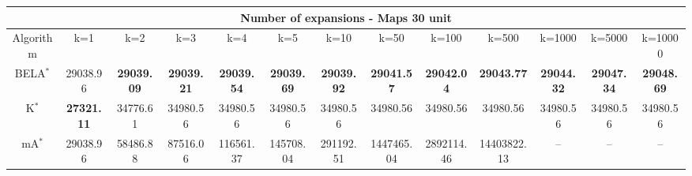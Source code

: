 \begin{tabular}{c|cccccccccccc}\toprule
\multicolumn{13}{c}{Number of expansions - Maps 30 unit}\\ \midrule
Algorithm & k=1 & k=2 & k=3 & k=4 & k=5 & k=10 & k=50 & k=100 & k=500 & k=1000 & k=5000 & k=10000 \\ \midrule
BELA$^*$ & 29038.96 & \textbf{29039.09} & \textbf{29039.21} & \textbf{29039.54} & \textbf{29039.69} & \textbf{29039.92} & \textbf{29041.57} & \textbf{29042.04} & \textbf{29043.77} & \textbf{29044.32} & \textbf{29047.34} & \textbf{29048.69} \\
K$^*$ & \textbf{27321.11} & 34776.61 & 34980.56 & 34980.56 & 34980.56 & 34980.56 & 34980.56 & 34980.56 & 34980.56 & 34980.56 & 34980.56 & 34980.56 \\
mA$^*$ & 29038.96 & 58486.88 & 87516.06 & 116561.37 & 145708.04 & 291192.51 & 1447465.04 & 2892114.46 & 14403822.13 & -- & -- & -- \\ \bottomrule 
\end{tabular}
